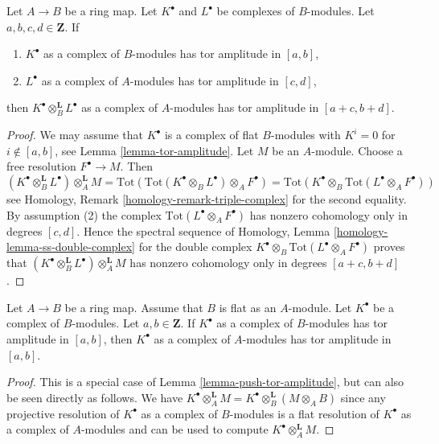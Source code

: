 \begin{lemma}
\label{lemma-push-tor-amplitude}
Let $A \to B$ be a ring map. Let $K^\bullet$ and $L^\bullet$ be complexes
of $B$-modules. Let $a, b, c, d \in \mathbf{Z}$. If
\begin{enumerate}
\item $K^\bullet$ as a complex of $B$-modules has tor amplitude in $[a, b]$,
\item $L^\bullet$ as a complex of $A$-modules has tor amplitude in $[c, d]$,
\end{enumerate}
then $K^\bullet \otimes^\mathbf{L}_B L^\bullet$ as a complex of $A$-modules
has tor amplitude in $[a + c, b + d]$.
\end{lemma}

\begin{proof}
We may assume that $K^\bullet$ is a complex of flat $B$-modules with $K^i = 0$
for $i \not \in [a, b]$, see Lemma \ref{lemma-tor-amplitude}.
Let $M$ be an $A$-module. Choose a free resolution $F^\bullet \to M$.
Then
$$
(K^\bullet \otimes_B^\mathbf{L} L^\bullet) \otimes_A^{\mathbf{L}} M =
\text{Tot}(\text{Tot}(K^\bullet \otimes_B L^\bullet) \otimes_A F^\bullet) =
\text{Tot}(K^\bullet \otimes_B \text{Tot}(L^\bullet \otimes_A F^\bullet))
$$
see Homology, Remark \ref{homology-remark-triple-complex} for the second
equality. By assumption (2) the complex
$\text{Tot}(L^\bullet \otimes_A F^\bullet)$
has nonzero cohomology only in degrees $[c, d]$. Hence the spectral sequence of
Homology, Lemma \ref{homology-lemma-ss-double-complex}
for the double complex
$K^\bullet \otimes_B \text{Tot}(L^\bullet \otimes_A F^\bullet)$
proves that
$(K^\bullet \otimes_B^\mathbf{L} L^\bullet) \otimes_A^{\mathbf{L}} M$
has nonzero cohomology only in degrees $[a + c, b + d]$.
\end{proof}

\begin{lemma}
\label{lemma-flat-push-tor-amplitude}
Let $A \to B$ be a ring map. Assume that $B$ is flat as an
$A$-module. Let $K^\bullet$ be a complex of $B$-modules.
Let $a, b \in \mathbf{Z}$. If $K^\bullet$ as a complex of $B$-modules
has tor amplitude in $[a, b]$, then $K^\bullet$ as a complex of
$A$-modules has tor amplitude in $[a, b]$.
\end{lemma}

\begin{proof}
This is a special case of Lemma \ref{lemma-push-tor-amplitude}, but can also
be seen directly as follows. We have
$K^\bullet \otimes_A^{\mathbf{L}} M =
K^\bullet \otimes_B^{\mathbf{L}} (M \otimes_A B)$
since any projective resolution of $K^\bullet$ as a complex of $B$-modules
is a flat resolution of $K^\bullet$ as a complex of $A$-modules and
can be used to compute $K^\bullet \otimes_A^{\mathbf{L}} M$.
\end{proof}


